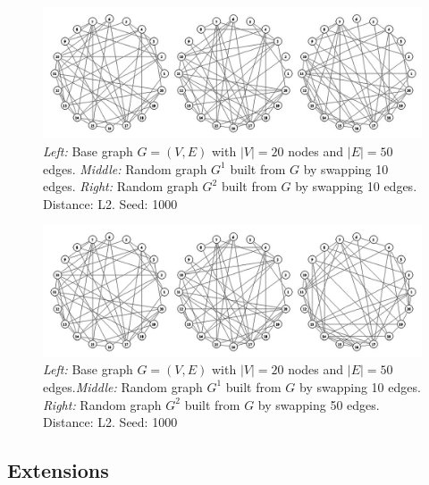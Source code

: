 \begin{figure}[htb]
	\begin{center}
		\includegraphics[width=1\linewidth]{ch-gc/figures/sim_10vs10}
		\caption[Random graphs with 20 nodes and 50 edges. Edges have been 
		swapped 10 times each.]{\textit{Left:} Base graph $G=(V,E)$ with 
		$|V|=20$ nodes and $|E|=50$ edges. 
		\textit{Middle:} Random graph $G^1$ built from $G$ by swapping 
		10 edges. \textit{Right:} Random graph $G^2$ built from $G$ by 
		swapping 10 edges. Distance: L2. Seed: 1000}
		\label{fig:gc:sim10vs10}
	\end{center}
\end{figure}

\begin{figure}[htb]
	\begin{center}
		\includegraphics[width=1\linewidth]{ch-gc/figures/sim_10vs50}
		\caption[Random graphs with 20 nodes and 50 edges. Edges have been 
		swapped 10 and 50 times, respectively.]{\textit{Left:} Base graph 
		$G=(V,E)$ with $|V|=20$ nodes and $|E|=50$ edges.\textit{Middle:} 
		Random graph $G^1$ built from $G$ by swapping 10 edges. 
		\textit{Right:} Random graph $G^2$ built from $G$ by swapping 
		50 edges. Distance: L2. Seed: 1000}
		\label{fig:gc:sim10vs50}
	\end{center}
\end{figure}

\subsection{Extensions}
\label{sec:gc:extensions}

